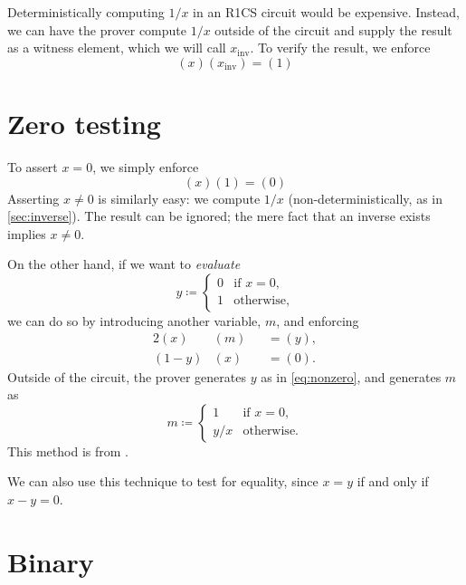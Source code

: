 \documentclass{article}
\begin{document}
Deterministically computing $1 / x$ in an R1CS circuit would be expensive. Instead, we can have the prover compute $1 / x$ outside of the circuit and supply the result as a witness element, which we will call $x_\mathrm{inv}$. To verify the result, we enforce
\begin{equation}
  (x) (x_\mathrm{inv}) = (1)
\end{equation}


\section{Zero testing} \label{sec:zerotest}

To assert $x = 0$, we simply enforce
\begin{equation}
  (x) (1) = (0)
\end{equation}
Asserting $x \ne 0$ is similarly easy: we compute $1 / x$ (non-deterministically, as in \autoref{sec:inverse}). The result can be ignored; the mere fact that an inverse exists implies $x \ne 0$.

On the other hand, if we want to \textit{evaluate}
\begin{equation} \label{eq:nonzero}
  y \coloneqq
  \begin{cases}
    0 & \text{if $x = 0$,} \\
    1 & \text{otherwise,}
  \end{cases}
\end{equation}
we can do so by introducing another variable, $m$, and enforcing
\begin{alignat}{2}
  (x)     & (m) &&= (y), \\
  (1 - y) & (x) &&= (0).
\end{alignat}
Outside of the circuit, the prover generates $y$ as in \autoref{eq:nonzero}, and generates $m$ as
\begin{equation}
  m \coloneqq
  \begin{cases}
    1 & \text{if $x = 0$,} \\
    y / x & \text{otherwise.}
  \end{cases}
\end{equation}
This method is from \cite{parno2013pinocchio}.

We can also use this technique to test for equality, since $x = y$ if and only if $x - y = 0$.


\section{Binary}
\end{document}
